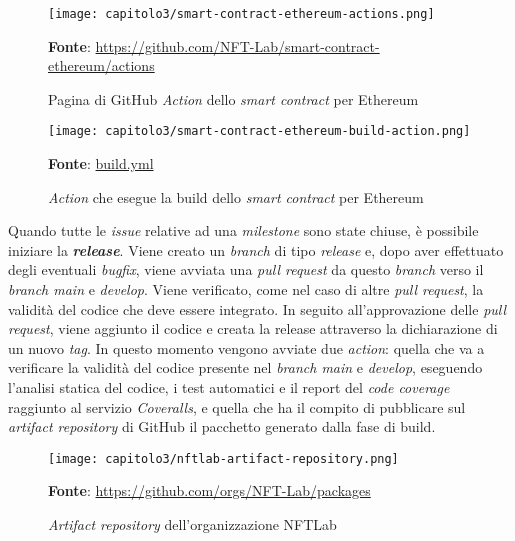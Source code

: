 \begin{figure}[h!]
  \centering
  \texttt{[image: capitolo3/smart-contract-ethereum-actions.png]}
  \caption{Pagina di GitHub \textit{Action} dello \textit{smart contract} per Ethereum}
  \textbf{Fonte}: \href{https://github.com/NFT-Lab/smart-contract-ethereum/actions}{https://github.com/NFT-Lab/smart-contract-ethereum/actions}
\end{figure}

\begin{figure}[h!]
  \centering
  \texttt{[image: capitolo3/smart-contract-ethereum-build-action.png]}
  \caption{\textit{Action} che esegue la build dello \textit{smart contract} per Ethereum}
  \textbf{Fonte}: \href{https://github.com/NFT-Lab/smart-contract-ethereum/blob/main/.github/workflows/build.yml}{build.yml}
\end{figure}

Quando tutte le \textit{issue} relative ad una \textit{milestone} sono state chiuse, è possibile iniziare la \textbf{\textit{release}}. Viene creato un \textit{branch} di tipo \textit{release} e, dopo aver effettuato degli eventuali \textit{bugfix}, viene avviata una \textit{pull request} da questo \textit{branch} verso il \textit{branch main} e \textit{develop}. Viene verificato, come nel caso di altre \textit{pull request}, la validità del codice che deve essere integrato. In seguito all'approvazione delle \textit{pull request}, viene aggiunto il codice e creata la release attraverso la dichiarazione di un nuovo \textit{tag}. In questo momento vengono avviate due \textit{action}: quella che va a verificare la validità del codice presente nel \textit{branch main} e \textit{develop}, eseguendo l'analisi statica del codice, i test automatici e il report del \textit{code coverage} raggiunto al servizio \textit{Coveralls}, e quella che ha il compito di pubblicare sul \textit{artifact repository} di GitHub il pacchetto generato dalla fase di build.

\begin{figure}[h!]
  \centering
  \texttt{[image: capitolo3/nftlab-artifact-repository.png]}
  \caption{\textit{Artifact repository} dell'organizzazione NFTLab}
  \textbf{Fonte}: \href{https://github.com/orgs/NFT-Lab/packages}{https://github.com/orgs/NFT-Lab/packages}
\end{figure}
